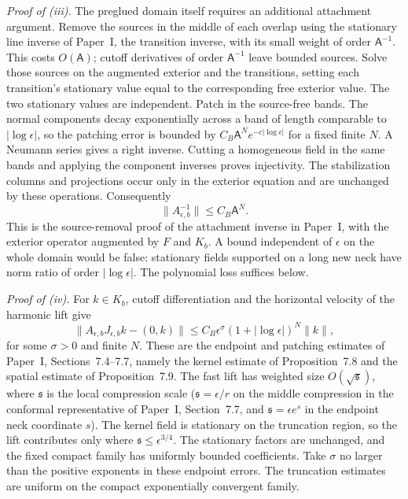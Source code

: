 \documentclass[11pt]{amsart}
\theoremstyle{definition}
\theoremstyle{remark}
\theoremstyle{plain}
\numberwithin{equation}{section}
\begin{document}
\emph{Proof of (iii).} The preglued domain itself requires an additional attachment argument.
Remove the sources in the middle
of each overlap using the stationary line inverse of Paper~I,
the transition inverse, with its small weight of order $\mathsf A^{-1}$.
This costs $O(\mathsf A)$; cutoff derivatives of order
$\mathsf A^{-1}$ leave bounded sources. Solve those sources on
the augmented exterior and the transitions, setting each
transition's stationary value equal to the corresponding free
exterior value. The two stationary values are independent.
Patch in the source-free bands. The normal components decay
exponentially across a band of length comparable to
$|\log\epsilon|$, so the patching error is bounded by
$C_B\mathsf A^N e^{-c|\log\epsilon|}$ for a fixed finite $N$.
A Neumann series gives a right inverse. Cutting a homogeneous
field in the same bands and applying the component inverses
proves injectivity. The stabilization columns and projections
occur only in the exterior equation and are unchanged by these
operations. Consequently
\[
 \|A_{\epsilon,b}^{-1}\|\le C_B\mathsf A^N.
\]
This is the source-removal proof of the attachment inverse in
Paper~I, with the exterior operator augmented by $F$ and $K_b$.
A bound independent of $\epsilon$ on the whole domain would be
false: stationary fields supported on a long new neck have norm
ratio of order $|\log\epsilon|$. The polynomial loss suffices
below.

\emph{Proof of (iv).} For $k\in K_b$, cutoff differentiation and the horizontal
velocity of the harmonic lift give
\[
 \|A_{\epsilon,b}J_{\epsilon,b}k-(0,k)\|
 \le C_B\epsilon^\sigma(1+|\log\epsilon|)^N\|k\|,
\]
for some $\sigma>0$ and finite $N$. These are the endpoint and
patching estimates of Paper~I, Sections~7.4--7.7, namely the kernel
estimate of Proposition~7.8 and the spatial estimate of
Proposition~7.9. The fast lift has weighted size
$O(\sqrt{\mathfrak s})$, where $\mathfrak s$ is the local compression
scale ($\mathfrak s=\epsilon/r$ on the middle compression in the
conformal representative of Paper~I, Section~7.7, and
$\mathfrak s=\epsilon e^s$ in the endpoint neck coordinate $s$). The
kernel field is stationary on the truncation region, so the lift
contributes only where $\mathfrak s\le\epsilon^{3/4}$. The stationary factors
are unchanged, and the fixed compact family has uniformly bounded
coefficients. Take $\sigma$ no larger than the positive exponents in
these endpoint errors. The truncation estimates are uniform on the
compact exponentially convergent family.
\end{document}
